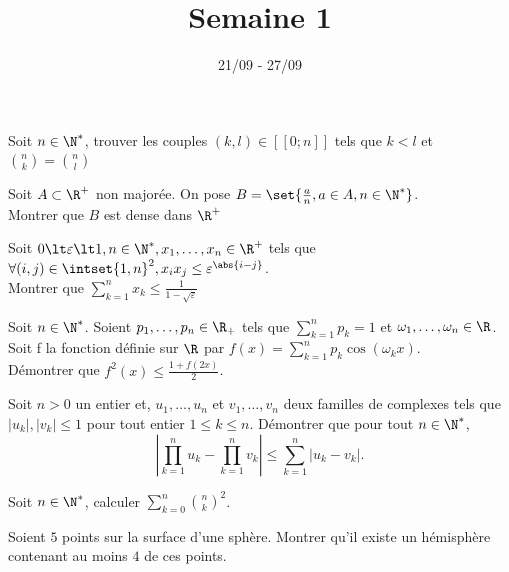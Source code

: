 \documentclass[11pt,a4paper]{article}
\begin{document}
\title{Semaine 1}
\author{}
\date{21/09 - 27/09 }

\maketitle


\begin{exercise}
Soit $n\in\N^*$, trouver les couples $(k,l)\in[\![0;n]\!]$ tels que $k\lt l$ et $\binom{n}{k}=\binom{n}{l}$
\end{exercise}

\begin{exercise}
Soit $A\subset\R^+$ non majorée. On pose $B=\set{\frac{a}{n},a\in A, n\in\N^*}$.\\
Montrer que $B$ est dense dans $\R^+$
\end{exercise}

\begin{exercise}
Soit $0\lt\varepsilon\lt1, n\in\N^*, x_1,\ldots,x_n\in\R^+$ tels que $\forall (i,j)\in\intset{1,n}^2, x_ix_j\leq\varepsilon^{\abs{i-j}}$.\\
Montrer que $\displaystyle\sum_{k=1}^nx_k\leq \frac{1}{1-\sqrt{\varepsilon}}$
\end{exercise}

\begin{exercise}
Soit $n\in\N^*$.
Soient $p_1,\ldots,p_n\in\R_+$ tels que
$\displaystyle\sum_{k=1}^np_k=1$
et $\omega_1,\ldots,\omega_n\in\R$. \\
Soit f la fonction définie sur $\R$ par
$f(x)=\displaystyle\sum_{k=1}^np_k\cos{(\omega_kx)}$.\\
Démontrer que
$f^2(x)\le\frac{1+f(2x)}{2}$.
\end{exercise}

\begin{exercise}
Soit $n>0$ un entier et, $u_1,\ldots,u_n$ et $v_1,\ldots,v_n$ deux familles de complexes tels que $|u_k|,|v_k|\le1$ pour tout entier $1\le k\le n$. Démontrer que pour tout $n\in\N^*$,
\[\left|\prod_{k=1}^nu_k-\prod_{k=1}^nv_k\right|\le\sum_{k=1}^n|u_k-v_k|.\]
\end{exercise}

\begin{exercise}
Soit $n\in\N^*$, calculer $\displaystyle\sum_{k=0}^n\binom{n}{k}^2$.
\end{exercise}

\begin{exercise}
Soient $5$ points sur la surface d'une sphère. Montrer qu'il existe un hémisphère contenant au moins $4$ de ces points.
\end{exercise}
\end{document}
